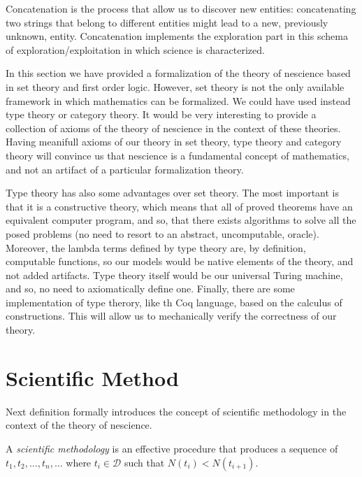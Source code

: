 Concatenation is the process that allow us to discover new entities: concatenating two strings
that belong to different entities might lead to a new, previously unknown, entity. Concatenation
implements the exploration part in this schema of exploration/exploitation in which science is
characterized.


\begin{remark}
In this section we have provided a formalization of the theory of nescience based in set theory and first order logic. However, set theory is not the only available framework in which mathematics can be formalized. We could have used instead type theory or category theory. It would be very interesting to provide a collection of axioms of the theory of nescience in the context of these theories. Having meanifull axioms of our theory in set theory, type theory and category theory will convince us that nescience is a fundamental concept of mathematics, and not an artifact of a particular formalization theory.

Type theory has also some advantages over set theory. The most important is that it is a constructive theory, which means that all of proved theorems have an equivalent computer program, and so, that there exists algorithms to solve all the posed problems (no need to resort to an abstract, uncomputable, oracle). Moreover, the lambda terms defined by type theory are, by definition, computable functions, so our models would be native elements of the theory, and not added artifacts. Type theory itself would be our universal Turing machine, and so, no need to axiomatically define one. Finally, there are some implementation of type therory, like th Coq language, based on the calculus of constructions. This will allow us to mechanically verify the correctness of our theory.
\end{remark}



%
%

\section{Scientific Method}

Next definition formally introduces the concept of scientific methodology in the context of the theory of nescience.

\begin{definition}
A \emph{scientific methodology} is an effective procedure that produces a sequence of $t_1, t_2, \ldots, t_n, \ldots$ where $t_i \in \mathcal{D}$ such that $N(t_i) < N(t_{i+1})$.
\end{definition}

